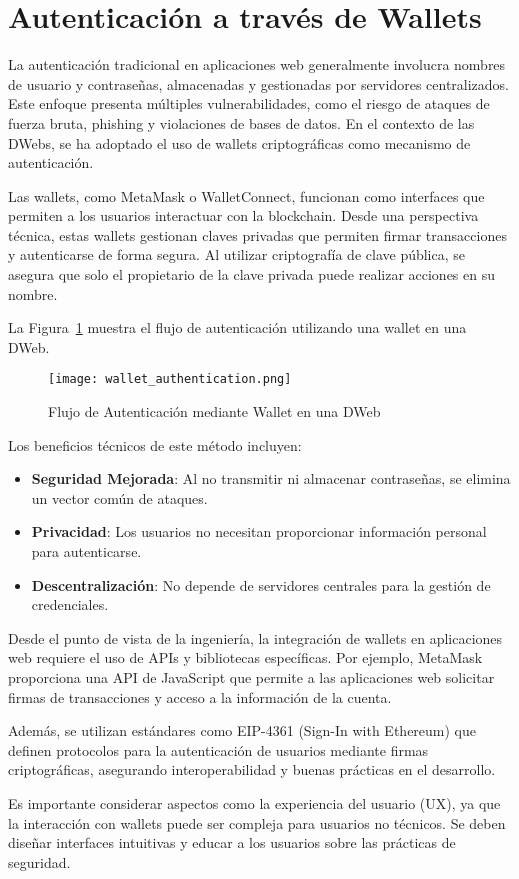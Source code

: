 \section{Autenticación a través de Wallets}

La autenticación tradicional en aplicaciones web generalmente involucra nombres de usuario y contraseñas, almacenadas y gestionadas por servidores centralizados. Este enfoque presenta múltiples vulnerabilidades, como el riesgo de ataques de fuerza bruta, phishing y violaciones de bases de datos. En el contexto de las DWebs, se ha adoptado el uso de wallets criptográficas como mecanismo de autenticación.

Las wallets, como MetaMask o WalletConnect, funcionan como interfaces que permiten a los usuarios interactuar con la blockchain. Desde una perspectiva técnica, estas wallets gestionan claves privadas que permiten firmar transacciones y autenticarse de forma segura. Al utilizar criptografía de clave pública, se asegura que solo el propietario de la clave privada puede realizar acciones en su nombre.

La Figura~\ref{fig:wallet_authentication} muestra el flujo de autenticación utilizando una wallet en una DWeb.

\begin{figure}[H]
    \centering
    \texttt{[image: wallet\_authentication.png]}
    \caption{Flujo de Autenticación mediante Wallet en una DWeb}
    \label{fig:wallet_authentication}
\end{figure}

Los beneficios técnicos de este método incluyen:

\begin{itemize}
    \item \textbf{Seguridad Mejorada}: Al no transmitir ni almacenar contraseñas, se elimina un vector común de ataques.
    \item \textbf{Privacidad}: Los usuarios no necesitan proporcionar información personal para autenticarse.
    \item \textbf{Descentralización}: No depende de servidores centrales para la gestión de credenciales.
\end{itemize}

Desde el punto de vista de la ingeniería, la integración de wallets en aplicaciones web requiere el uso de APIs y bibliotecas específicas. Por ejemplo, MetaMask proporciona una API de JavaScript que permite a las aplicaciones web solicitar firmas de transacciones y acceso a la información de la cuenta.

Además, se utilizan estándares como EIP-4361 (Sign-In with Ethereum) que definen protocolos para la autenticación de usuarios mediante firmas criptográficas, asegurando interoperabilidad y buenas prácticas en el desarrollo.

Es importante considerar aspectos como la experiencia del usuario (UX), ya que la interacción con wallets puede ser compleja para usuarios no técnicos. Se deben diseñar interfaces intuitivas y educar a los usuarios sobre las prácticas de seguridad.

